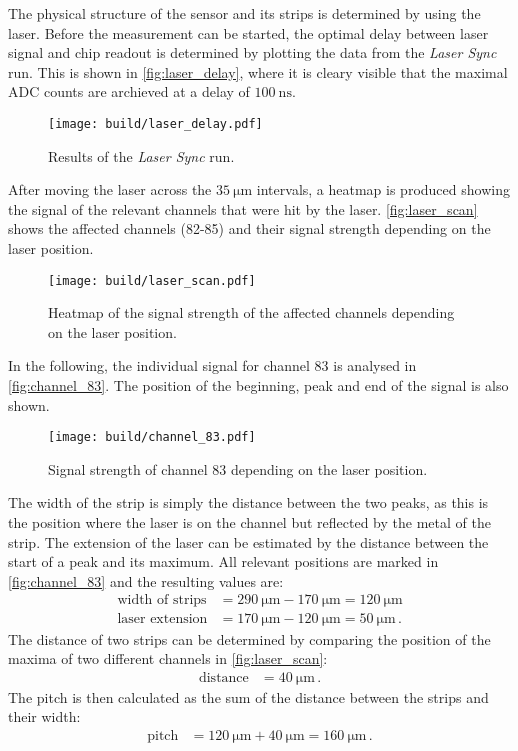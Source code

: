 The physical structure of the sensor and its strips is determined by using the laser.
Before the measurement can be started, the optimal delay between laser signal and chip readout
is determined by plotting the data from the \textit{Laser Sync} run. This is shown in
\autoref{fig:laser_delay}, where it is cleary visible that the maximal ADC counts are archieved at a
delay of $\qty{100}{\nano\second}$.

\begin{figure}[H]
  \centering
  \texttt{[image: build/laser\_delay.pdf]}
  \caption{Results of the \textit{Laser Sync} run.}
  \label{fig:laser_delay}
\end{figure}

After moving the laser across the $\qty{35}{\micro\meter}$ intervals, a heatmap is produced
showing the signal of the relevant channels that were hit by the laser. 
\autoref{fig:laser_scan} shows the affected channels (82-85) and their signal strength depending
on the laser position.

\begin{figure}[H]
  \centering
  \texttt{[image: build/laser\_scan.pdf]}
  \caption{Heatmap of the signal strength of the affected channels depending on the laser position.}
  \label{fig:laser_scan}
\end{figure}

In the following, the individual signal for channel 83 is analysed in \autoref{fig:channel_83}.
The position of the beginning, peak and end of the signal is also shown.

\begin{figure}[H]
  \centering
  \texttt{[image: build/channel\_83.pdf]}
  \caption{Signal strength of channel 83 depending on the laser position.}
  \label{fig:channel_83}
\end{figure}

The width of the strip is simply the distance between the two peaks, as this is the position where the laser
is on the channel but reflected by the metal of the strip. The extension of the laser can be estimated by
the distance between the start of a peak and its maximum. All relevant positions are marked in
\autoref{fig:channel_83} and the resulting values are:
\begin{align*}
  \text{width of strips} &= \qty{290}{\micro\meter} - \qty{170}{\micro\meter} = \qty{120}{\micro\meter} \\
  \text{laser extension} &= \qty{170}{\micro\meter} - \qty{120}{\micro\meter} = \qty{50}{\micro\meter} \, .
\end{align*}
The distance of two strips can be determined by comparing the position of the maxima of two different channels
in \autoref{fig:laser_scan}:
\begin{align*}
  \text{distance} &= \qty{40}{\micro\meter} \, .
\end{align*}
The pitch is then calculated as the sum of the distance between the strips and their width:
\begin{align*}
  \text{pitch} &= \qty{120}{\micro\meter} + \qty{40}{\micro\meter} = \qty{160}{\micro\meter} \, .
\end{align*}

